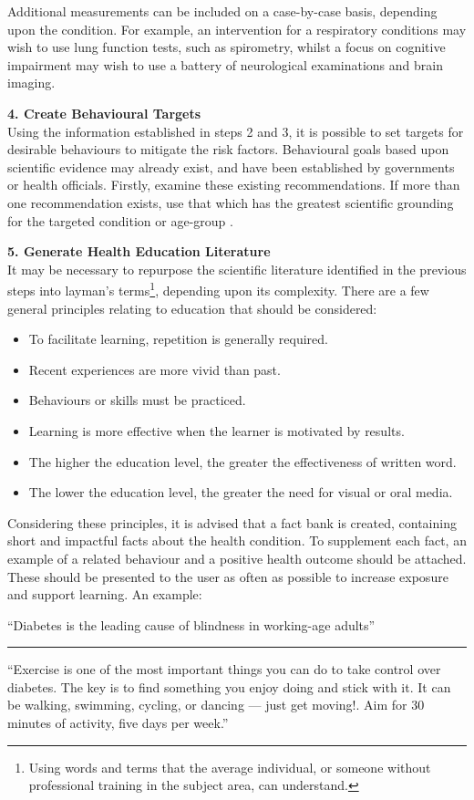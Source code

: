 Additional measurements can be included on a case-by-case basis, depending upon the condition. For example, an intervention for a respiratory conditions may wish to use lung function tests, such as spirometry, whilst a focus on cognitive impairment may wish to use a battery of neurological examinations and brain imaging.

\textbf{4. Create Behavioural Targets} \\
Using the information established in steps 2 and 3, it is possible to set targets for desirable behaviours to mitigate the risk factors. Behavioural goals based upon scientific evidence may already exist, and have been established by governments or health officials. Firstly, examine these existing recommendations. If more than one recommendation exists, use that which has the greatest scientific grounding for the targeted condition or age-group \cite{Stover2002, Pronk2004}.

\textbf{5. Generate Health Education Literature} \\
It may be necessary to repurpose the scientific literature identified in the previous steps into layman's terms\footnote{Using words and terms that the average individual, or someone without professional training in the subject area, can understand.}, depending upon its complexity.
There are a few general principles relating to education \cite{Gilbert2010} that should be considered:
\begin{itemize}[noitemsep,topsep=0pt]
\item To facilitate learning, repetition is generally required.
\item Recent experiences are more vivid than past.
\item Behaviours or skills must be practiced.
\item Learning is more effective when the learner is motivated by results.
\item The higher the education level, the greater the effectiveness of written word.
\item The lower the education level, the greater the need for visual or oral media.
\end{itemize}

Considering these principles, it is advised that a fact bank is created, containing short and impactful facts about the health condition. To supplement each fact, an example of a related behaviour and a positive health outcome should be attached. These should be presented to the user as often as possible to increase exposure and support learning. An example:
\begin{displayquote}
``Diabetes is the leading cause of blindness in working-age adults''
\begin{center}
	\rule{1cm}{0.4pt}
\end{center}
``Exercise is one of the most important things you can do to take control over diabetes. The key is to find something you enjoy doing and stick with it. It can be walking, swimming, cycling, or dancing — just get moving!. Aim for 30 minutes of activity, five days per week.''
\end{displayquote}


